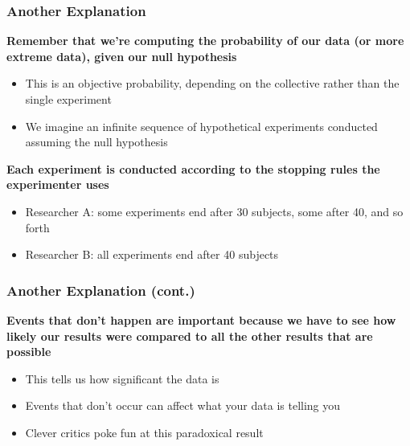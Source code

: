 \documentclass[10pt, block=fill]{beamer}
\begin{document}
\begin{frame}
    \frametitle{Another Explanation}
   
    \textbf{Remember that we're computing the probability of our data (or more extreme data), given our null hypothesis}
    \begin{itemize}
       \item This is an objective probability, depending on the collective rather than the single experiment
       \item We imagine an infinite sequence of hypothetical experiments conducted assuming the null hypothesis
    \end{itemize}
    
    \vspace{0.25in}
    
    \textbf{Each experiment is conducted according to the stopping rules the experimenter uses}
    \begin{itemize}
        \item Researcher A: some  experiments end after 30 subjects, some after 40, and so forth
        \item Researcher B: all experiments end after 40 subjects
    \end{itemize}


\end{frame}

\begin{frame}
    \frametitle{Another Explanation (cont.)}

    \textbf{Events that don't happen are important because we have to see how likely our results were compared to all the other results that are possible}
    \begin{itemize}
       \item This tells us how significant the data is
       \item Events that don't occur can affect what your data is telling you
       \item Clever critics poke fun at this paradoxical result
   \end{itemize}
\end{frame}
\end{document}
